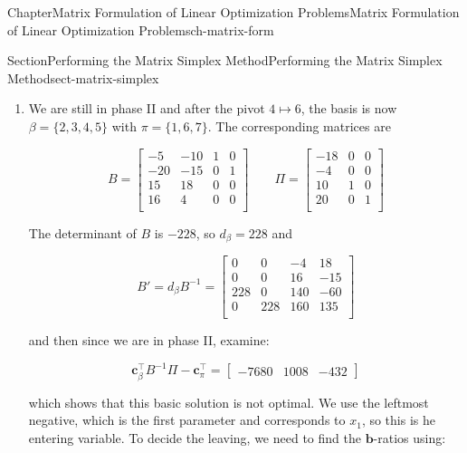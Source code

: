 \documentclass[oneside,10pt,]{book}
\numberwithin{equation}{section}
\newcommand{\amp}{&}
\begin{document}
\begin{chapterptx}{Chapter}{Matrix Formulation of Linear Optimization Problems}{}{Matrix Formulation of Linear Optimization Problems}{}{}{ch-matrix-form}
\begin{sectionptx}{Section}{Performing the Matrix Simplex Method}{}{Performing the Matrix Simplex Method}{}{}{sect-matrix-simplex}
\begin{introduction}{}
\begin{enumerate}
\item{}We are still in phase II and after the pivot \(4 \mapsto 6\), the basis is now \(\beta = \{2,3,4,5\}\) with \(\pi = \{1,6,7\}\). The corresponding matrices are%
\par
%
\begin{equation*}
B = \begin{bmatrix} -5 \amp -10 \amp 1 \amp 0 \\ -20 \amp -15 \amp 0 \amp 1 \\ 15 \amp  18 \amp 0 \amp 0 \\ 16 \amp   4 \amp 0 \amp 0 \\ \end{bmatrix} \qquad \Pi = \begin{bmatrix} -18 \amp 0 \amp 0 \\ -4 \amp 0 \amp 0 \\ 10 \amp 1 \amp 0 \\ 20 \amp 0 \amp 1 \\ \end{bmatrix}
\end{equation*}
%
\par
The determinant of \(B\) is \(-228\), so \(d_{\beta} = 228\) and%
\par
%
\begin{equation*}
B' = d_{\beta} B^{-1} = \begin{bmatrix} 0 \amp   0 \amp  -4 \amp  18 \\ 0 \amp   0 \amp  16 \amp -15 \\ 228 \amp   0 \amp 140 \amp -60 \\ 0 \amp 228 \amp 160 \amp 135 \\ \end{bmatrix}
\end{equation*}
%
\par
and then since we are in phase II, examine:%
\par
%
\begin{equation*}
\boldsymbol{c}_{\beta}^{\intercal}B^{-1}\Pi - \boldsymbol{c}_{\pi}^{\intercal} = \begin{bmatrix} -7680 \amp 1008 \amp -432 \end{bmatrix}
\end{equation*}
%
\par
which shows that this basic solution is not optimal. We use the leftmost negative, which is the first parameter and corresponds to \(x_1\), so this is he entering variable. To decide the leaving, we need to find the \(\boldsymbol{b}\)-ratios using:%
\par

\end{enumerate}
\end{introduction}
\end{sectionptx}
\end{chapterptx}
\end{document}
